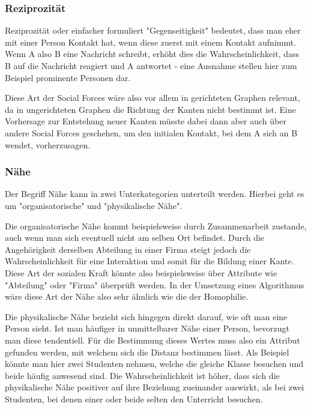 \subsubsection{Reziprozität}
Reziprozität oder einfacher formuliert "Gegenseitigkeit" bedeutet, dass man eher mit einer Person Kontakt hat, wenn
diese zuerst mit einem Kontakt aufnimmt. Wenn A also B eine Nachricht schreibt, erhöht dies die Wahrscheinlichkeit, dass B auf
die Nachricht reagiert und A antwortet - eine Ausnahme stellen hier zum Beispiel prominente Personen dar.

Diese Art der Social Forces wäre also vor allem in gerichteten Graphen relevant, da in ungerichteten Graphen die
Richtung der Kanten nicht bestimmt ist. Eine Vorhersage zur Entstehung neuer Kanten müsste dabei dann aber auch über
andere Social Forces geschehen, um den initialen Kontakt, bei dem A sich an B wendet, vorherzusagen.

\subsubsection{Nähe}
Der Begriff Nähe kann in zwei Unterkategorien unterteilt werden. Hierbei geht es um "organisatorische" und
"physikalische Nähe".

Die organisatorische Nähe kommt beispielsweise durch Zusammenarbeit zustande, auch wenn man sich eventuell nicht
am selben Ort befindet. Durch die Angehörigkeit derselben Abteilung in einer Firma steigt jedoch die Wahrscheinlichkeit
für eine Interaktion und somit für die Bildung einer Kante. Diese Art der sozialen Kraft könnte also beispielsweise
über Attribute wie "Abteilung" oder "Firma" überprüft werden. In der Umsetzung eines Algorithmus wäre diese Art der
Nähe also sehr ähnlich wie die der Homophilie.

Die physikalische Nähe bezieht sich hingegen direkt darauf, wie oft man eine Person sieht. Ist man häufiger in
unmittelbarer Nähe einer Person, bevorzugt man diese tendentiell. Für die Bestimmung dieses Wertes muss also ein Attribut
gefunden werden, mit welchem sich die Distanz bestimmen lässt. Als Beispiel könnte man hier zwei Studenten nehmen,
welche die gleiche Klasse besuchen und beide häufig anwesend sind. Die Wahrscheinlichkeit ist höher, dass sich die
physikalische Nähe positiver auf ihre Beziehung zueinander auswirkt, als bei zwei Studenten, bei denen einer oder
beide selten den Unterricht besuchen.

